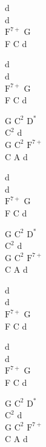 \begin{chord}
    d\\
    d\\
    $\mathrm{F^{7+}}$ G\\
    F C d

    d\\
    d\\
    $\mathrm{F^{7+}}$ G\\
    F C d

    G $\mathrm{C^{2}}$ $\mathrm{D^{*}}$\\
    $\mathrm{C^{2}}$ d\\
    G $\mathrm{C^{2}}$ $\mathrm{F^{7+}}$\\
    C A d

    d\\
    d\\
    $\mathrm{F^{7+}}$ G\\
    F C d

    G $\mathrm{C^{2}}$ $\mathrm{D^{*}}$\\
    $\mathrm{C^{2}}$ d\\
    G $\mathrm{C^{2}}$ $\mathrm{F^{7+}}$\\
    C A d

    d\\
    d\\
    $\mathrm{F^{7+}}$ G\\
    F C d

    d\\
    d\\
    $\mathrm{F^{7+}}$ G\\
    F C d

    G $\mathrm{C^{2}}$ $\mathrm{D^{*}}$\\
    $\mathrm{C^{2}}$ d\\
    G $\mathrm{C^{2}}$ $\mathrm{F^{7+}}$\\
    C A d
\end{chord}
